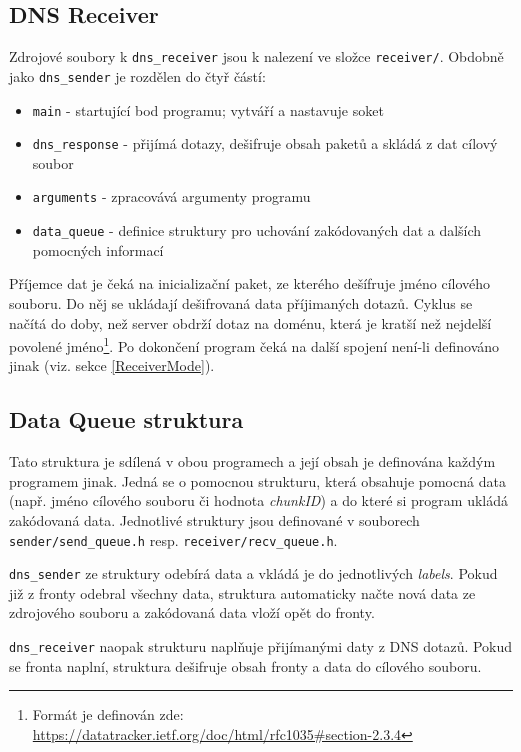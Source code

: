 \documentclass[a4paper,11pt]{article}
\begin{document}
    \subsection{DNS Receiver}
    Zdrojové soubory k \verb|dns_receiver| jsou k nalezení ve složce \verb|receiver/|. Obdobně jako \verb|dns_sender| je rozdělen
    do čtyř částí:
    \begin{itemize}
        \setlength\itemsep{1pt}
        \item \verb|main|           \-- startující bod programu; vytváří a nastavuje soket
        \item \verb|dns_response|   \-- přijímá dotazy, dešifruje obsah paketů a skládá z dat cílový soubor
        \item \verb|arguments|      \-- zpracovává argumenty programu
        \item \verb|data_queue|     \-- definice struktury pro uchování zakódovaných dat a dalších pomocných informací
    \end{itemize}
    Příjemce dat je čeká na inicializační paket, ze kterého dešífruje jméno cílového souboru. Do něj se ukládají dešifrovaná data
    příjimaných dotazů. Cyklus se načítá do doby, než server obdrží dotaz na doménu, která je kratší než nejdelší povolené jméno\footnote{Formát je definován zde: \url{https://datatracker.ietf.org/doc/html/rfc1035\#section-2.3.4}}.
    Po dokončení program čeká na další spojení není-li definováno jinak (viz. sekce \ref{ReceiverMode}).

    \subsection{Data Queue struktura}
    Tato struktura je sdílená v obou programech a její obsah je definována každým programem jinak.
    Jedná se o pomocnou strukturu, která obsahuje pomocná data (např. jméno cílového souboru či hodnota \emph{chunkID})
    a do které si program ukládá zakódovaná data. Jednotlivé struktury jsou definované v souborech
    \verb|sender/send_queue.h| resp. \verb|receiver/recv_queue.h|.

    \verb|dns_sender| ze struktury
    odebírá data a vkládá je do jednotlivých \emph{labels}. Pokud již z fronty odebral všechny data, struktura
    automaticky načte nová data ze zdrojového souboru a zakódovaná data vloží opět do fronty.

    \verb|dns_receiver| naopak strukturu naplňuje přijímanými daty z DNS dotazů. Pokud se fronta naplní, struktura
    dešifruje obsah fronty a data  do cílového souboru.
\end{document}
